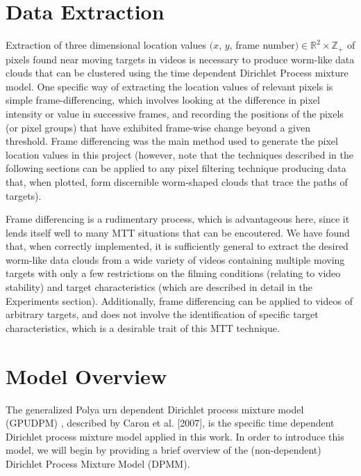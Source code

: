 \documentclass{article}
\begin{document}
\section{Data Extraction}

Extraction of three dimensional location values $(x$, $y$, frame number$) \in \mathbb{R}^{2} \times \mathbb{Z}_{+}$ of pixels found near moving targets in videos is necessary to produce worm-like data clouds that can be clustered using the time dependent Dirichlet Process mixture model. One specific way of extracting the location values of relevant pixels is simple frame-differencing, which involves looking at the difference in pixel intensity or value in successive frames, and recording the positions of the pixels (or pixel groups) that have exhibited frame-wise change beyond a given threshold. Frame differencing was the main method used to generate the pixel location values in this project (however, note that the techniques described in the following sections can be applied to any pixel filtering technique producing data that, when plotted, form discernible worm-shaped clouds that trace the paths of targets).

Frame differencing is a rudimentary process, which is advantageous here, since it lends itself well to many MTT situations that can be encoutered. We have found that, when correctly implemented, it is sufficiently general to extract the desired worm-like data clouds from a wide variety of videos containing multiple moving targets with only a few restrictions on the filming conditions (relating to video stability) and target characteristics (which are described in detail in the Experiments section). Additionally, frame differencing can be applied to videos of arbitrary targets, and does not involve the identification of specific target characteristics, which is a desirable trait of this MTT technique.







\section{Model Overview}

The generalized Polya urn dependent Dirichlet process mixture model (GPUDPM) \cite{Caron2007}, described by Caron et al. [2007], is the specific time dependent Dirichlet process mixture model applied in this work. In order to introduce this model, we will begin by providing a brief overview of the (non-dependent) Dirichlet Process Mixture Model (DPMM).
\end{document}
